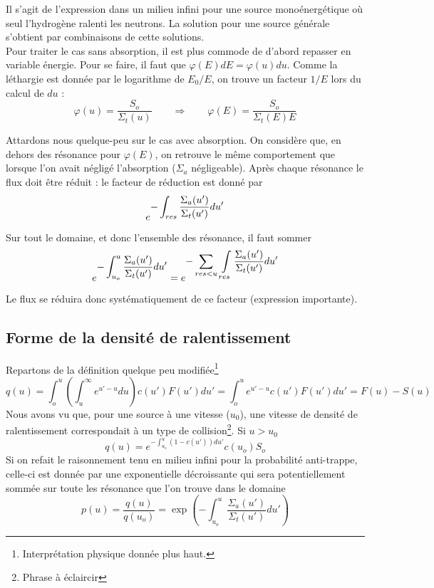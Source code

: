 	Il s'agit de l'expression dans un milieu infini pour une source monoénergétique où seul 
	l'hydrogène ralenti les neutrons. La solution pour une source générale s'obtient par combinaisons 
	de cette solutions.\\
	
	Pour traiter le cas sans absorption, il est plus commode de d'abord repasser en variable 
	énergie. Pour se faire, il faut que $\varphi(E)dE=\varphi(u)du$. Comme la léthargie est donnée 
	par le logarithme de $E_0/E$, on trouve un facteur $1/E$ lors du calcul de $du$ :
	\begin{equation}
	\varphi (u) = \frac{{{S_o}}}{{{\Sigma _t}(u)}}\qquad\Rightarrow\qquad
	\varphi (E) = \frac{{{S_o}}}{{{\Sigma _t}(E)E}}
	\end{equation}
	
	Attardons nous quelque-peu sur le cas avec absorption. On considère que, en dehors des 
	résonance pour $\varphi(E)$, on retrouve le même comportement que lorsque l'on avait 
	négligé l'absorption ($\Sigma_a$ négligeable). Après chaque résonance le flux doit être réduit :
	le facteur de réduction est donné par
	\begin{equation}
	{e^{\displaystyle- \int_{res}^{}    \frac{{{\Sigma _a}(u')}}{{{\Sigma _t}(u')}}du'}}
	\end{equation}
	Sur tout le domaine, et donc l'ensemble des résonance, il faut sommer
	\begin{equation}
	{e^{\displaystyle- \int_{{u_o}}^u  \frac{{{\Sigma _a}(u')}}{{{\Sigma _t}(u')}}du'}} = {e^{\displaystyle - \sum
	\limits_{res	 < u}   \,\int\limits_{res}   \frac{{{\Sigma _a}(u')}}{{{\Sigma _t}(u')}}du'}}
	\end{equation}
	Le flux se réduira donc systématiquement de ce facteur (expression importante).

	\subsection{Forme de la densité de ralentissement}
	Repartons de la définition quelque peu modifiée\footnote{Interprétation physique donnée plus
	haut.}
	\begin{equation}
	q(u) = \int_o^u   \left( \int_u^\infty    {e^{u' - u}}du\right)c(u')F(u')du' 
	= \int_o^u  {e^{u' - u}}c(u')F(u')du' = F(u) - S(u)
	\end{equation}
	Nous avons vu que, pour une source à une vitesse ($u_0$), une vitesse de densité de ralentissement 
	correspondait à un type de collision\footnote{Phrase à éclaircir}. Si $u>u_0$
	\begin{equation}
	q(u) = {e^{ - \int_{{u_o}}^u    (1 - c(u'))du'}}c({u_o}){S_o}
	\end{equation}
	Si on refait le raisonnement tenu en milieu infini pour la probabilité anti-trappe, celle-ci est 
	donnée par une exponentielle décroissante qui sera potentiellement sommée sur toute les 
	résonance que l'on trouve dans le domaine
	\begin{equation}
	p(u) = \frac{{q(u)}}{{q({u_o})}} = \exp \left( { - \int_{{u_o}}^u    \frac{{{\Sigma _a}(u')}
	}{{{\Sigma _t}(u')}}du'} \right)
	\end{equation}

